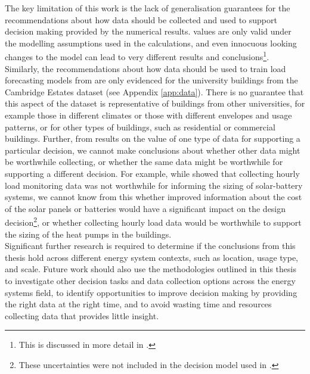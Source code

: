 The key limitation of this work is the lack of generalisation guarantees for the recommendations about how data should be collected and used to support decision making provided by the numerical results.  values are only valid under the modelling assumptions used in the calculations, and even innocuous looking changes to the model can lead to very different  results and conclusions\footnote{This is discussed in more detail in .}.
Similarly, the recommendations about how data should be used to train load forecasting models from  are only evidenced for the university buildings from the Cambridge Estates dataset (see Appendix \ref{app:data}). There is no guarantee that this aspect of the dataset is representative of buildings from other universities, for example those in different climates or those with different envelopes and usage patterns, or for other types of buildings, such as residential or commercial buildings.
Further, from results on the value of one type of data for supporting a particular decision, we cannot make conclusions about whether other data might be worthwhile collecting, or whether the same data might be worthwhile for supporting a different decision. For example, while  showed that collecting hourly load monitoring data was not worthwhile for informing the sizing of solar-battery systems, we cannot know from this whether improved information about the cost of the solar panels or batteries would have a significant impact on the design decision\footnote{These uncertainties were not included in the decision model used in .}, or whether collecting hourly load data would be worthwhile to support the sizing of the heat pumps in the buildings.\\

Significant further research is required to determine if the conclusions from this thesis hold across different energy system contexts, such as location, usage type, and scale. Future work should also use the methodologies outlined in this thesis to investigate other decision tasks and data collection options across the energy systems field, to identify opportunities to improve decision making by providing the right data at the right time, and to avoid wasting time and resources collecting data that provides little insight.

